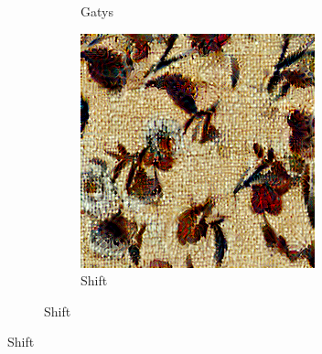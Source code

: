 \begin{figure}[ht]
\begin{subfigure}{0.8\textwidth}
\begin{subfigure}{0.32\textwidth}
            \caption{Gatys}
            \label{fig:methods_comparison_small-vanilla}
        \end{subfigure}
        \hfill
        \begin{subfigure}{0.32\textwidth}
            \centering
            \includegraphics[width=\textwidth]{images/03-comparison_small_shift.jpg}
            \caption{Shift}
            \label{fig:methods_comparison_small-shift}
        \end{subfigure}
        

\end{subfigure}
\end{figure}
